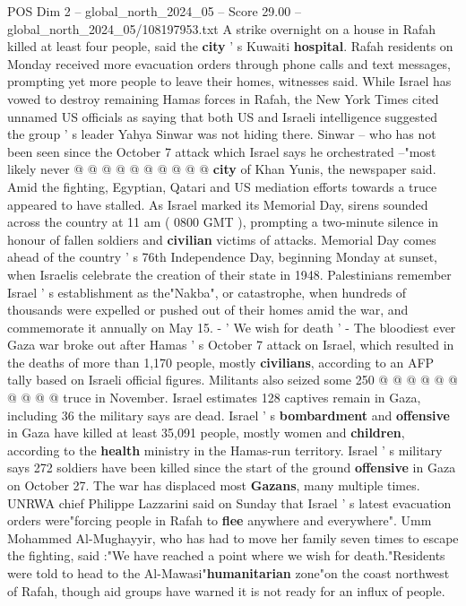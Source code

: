 \begin{textsample}{POS Dim 2 – global\_north\_2024\_05 – Score 29.00 – global\_north\_2024\_05/108197953.txt}
A strike overnight on a house in Rafah killed at least four people, said the \textbf{city} ' s Kuwaiti \textbf{hospital}.
Rafah residents on Monday received more evacuation orders through phone calls and text messages, prompting yet more people to leave their homes, witnesses said.
While Israel has vowed to destroy remaining Hamas forces in Rafah, the New York Times cited unnamed US officials as saying that both US and Israeli intelligence suggested the group ' s leader Yahya Sinwar was not hiding there.
Sinwar -- who has not been seen since the October 7 attack which Israel says he orchestrated --"most likely never @ @ @ @ @ @ @ @ @ @ \textbf{city} of Khan Yunis, the newspaper said.
Amid the fighting, Egyptian, Qatari and US mediation efforts towards a truce appeared to have stalled.
As Israel marked its Memorial Day, sirens sounded across the country at 11 am ( 0800 GMT ), prompting a two-minute silence in honour of fallen soldiers and \textbf{civilian} victims of attacks.
Memorial Day comes ahead of the country ' s 76th Independence Day, beginning Monday at sunset, when Israelis celebrate the creation of their state in 1948.
Palestinians remember Israel ' s establishment as the"Nakba", or catastrophe, when hundreds of thousands were expelled or pushed out of their homes amid the war, and commemorate it annually on May 15. - ' We wish for death ' - The bloodiest ever Gaza war broke out after Hamas ' s October 7 attack on Israel, which resulted in the deaths of more than 1,170 people, mostly \textbf{civilians}, according to an AFP tally based on Israeli official figures.
Militants also seized some 250 @ @ @ @ @ @ @ @ @ @ truce in November.
Israel estimates 128 captives remain in Gaza, including 36 the military says are dead.
Israel ' s \textbf{bombardment} and \textbf{offensive} in Gaza have killed at least 35,091 people, mostly women and \textbf{children}, according to the \textbf{health} ministry in the Hamas-run territory.
Israel ' s military says 272 soldiers have been killed since the start of the ground \textbf{offensive} in Gaza on October 27.
The war has displaced most \textbf{Gazans}, many multiple times.
UNRWA chief Philippe Lazzarini said on Sunday that Israel ' s latest evacuation orders were"forcing people in Rafah to \textbf{flee} anywhere and everywhere".
Umm Mohammed Al-Mughayyir, who has had to move her family seven times to escape the fighting, said :"We have reached a point where we wish for death."Residents were told to head to the Al-Mawasi"\textbf{humanitarian} zone"on the coast northwest of Rafah, though aid groups have warned it is not ready for an influx of people.

\end{textsample}
